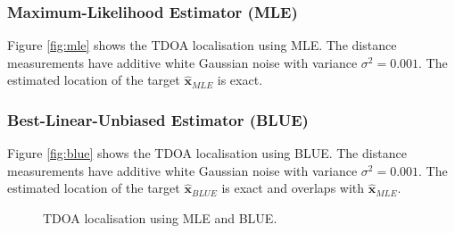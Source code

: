 \documentclass[11pt]{article}
\newcommand{\bx}{\mathbf{x}}
\begin{document}

\subsubsection*{Maximum-Likelihood Estimator (MLE)}
\label{subsubsec:mleImplementation}

Figure \ref{fig:mle} shows the TDOA localisation using MLE. The distance measurements have additive white Gaussian noise with variance $\sigma^{2} = 0.001$. The estimated location of the target $\hat{\bx}_{MLE}$ is exact.


\subsubsection*{Best-Linear-Unbiased Estimator (BLUE)}
\label{subsubsec:blueImplementation}

Figure \ref{fig:blue} shows the TDOA localisation using BLUE. The distance measurements have additive white Gaussian noise with variance $\sigma^{2} = 0.001$. The estimated location of the target $\hat{\bx}_{BLUE}$ is exact and overlaps with $\hat{\bx}_{MLE}$.
\begin{figure}[h]
\centering
{}
\caption{TDOA localisation using MLE and BLUE.}
\end{figure}
\end{document}
